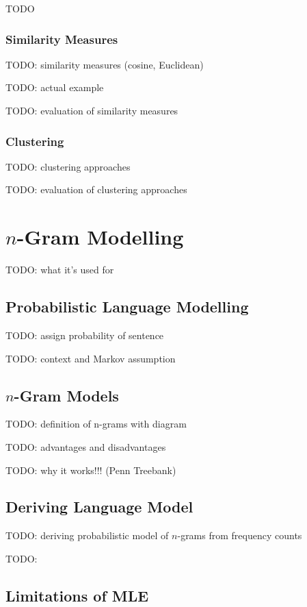 \documentclass{article}
\begin{document}
TODO

\subsubsection{Similarity Measures}

TODO: similarity measures (cosine, Euclidean)

TODO: actual example

TODO: evaluation of similarity measures

\subsubsection{Clustering}

TODO: clustering approaches

TODO: evaluation of clustering approaches

\section{$n$-Gram Modelling}

TODO: what it's used for

\subsection{Probabilistic Language Modelling}

TODO: assign probability of sentence

TODO: context and Markov assumption

\subsection{$n$-Gram Models}

TODO: definition of n-grams with diagram

TODO: advantages and disadvantages

TODO: why it works!!! (Penn Treebank)

\subsection{Deriving Language Model}

TODO: deriving probabilistic model of $n$-grams from frequency counts

TODO:

\subsection{Limitations of MLE}
\end{document}

